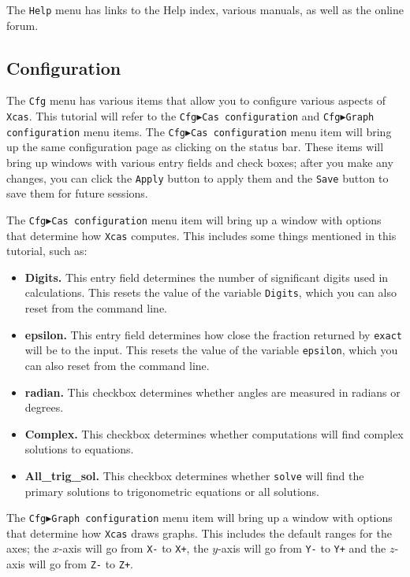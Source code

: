 \documentclass{article}
\begin{document}
The \texttt{Help} menu has links to the Help index, various manuals,
as well as the online forum.  

\subsection{Configuration}
\label{config}

The \texttt{Cfg} menu has various items that allow you to configure
various aspects of \texttt{Xcas}.  This tutorial will
refer to the \texttt{Cfg$\blacktriangleright$Cas configuration} and 
\texttt{Cfg$\blacktriangleright$Graph configuration} menu items.  The
\texttt{Cfg$\blacktriangleright$Cas configuration} menu item will
bring up the same configuration page as clicking on the status bar.
These items will bring up windows with various entry fields and
check boxes; after you make any changes, you can click the
\texttt{Apply} button to apply them and the \texttt{Save} button to
save them for future sessions.

The \texttt{Cfg$\blacktriangleright$Cas configuration} menu item will
bring up a window with options that determine how \texttt{Xcas} computes.
This includes some things mentioned in this tutorial, such as:
\begin{itemize}
  \item
  \textbf{Digits.}
  This entry field determines the number of significant digits used in
  calculations.  This resets the value of the variable \texttt{Digits},
  which you can also reset from the command line.
  \item
  \textbf{epsilon.}
  This entry field determines how close the fraction returned by
  \texttt{exact} will be to the input.  This resets the value of the
  variable \texttt{epsilon}, which you can also reset from the command
  line.
  \item
  \textbf{radian.}
  This checkbox determines whether angles are measured in radians or
  degrees.
  \item
  \textbf{Complex.}
  This checkbox determines whether computations will find complex
  solutions to equations.
  \item
  \textbf{All\_trig\_sol.}
  This checkbox determines whether \texttt{solve} will find the
  primary solutions to trigonometric equations or all solutions.
\end{itemize}

The \texttt{Cfg$\blacktriangleright$Graph configuration} menu item
will bring up a window with options that determine how \texttt{Xcas}
draws graphs.  This includes the default ranges for the axes; the
$x$-axis will go from \texttt{X-} to \texttt{X+}, the $y$-axis will go
from \texttt{Y-} to \texttt{Y+} and the $z$-axis will go from
\texttt{Z-} to \texttt{Z+}.
\end{document}
